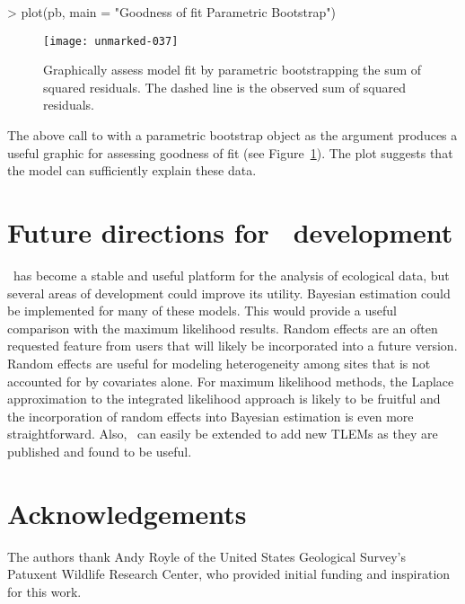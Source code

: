 \documentclass[article,shortnames]{jss}
\newcommand{\um}{\pkg{unmarked}}
\begin{document}
\begin{Schunk}
\begin{Sinput}
> plot(pb, main = "Goodness of fit Parametric Bootstrap")
\end{Sinput}
\end{Schunk}

\begin{figure}[ht]
  \centering
\texttt{[image: unmarked-037]}
\caption{Graphically assess model fit by parametric bootstrapping
  the sum of squared residuals.  The dashed line is the observed sum
  of squared residuals.}
\label{fig:pb}
\end{figure}


The above call to  with a parametric bootstrap object as
the argument produces a useful graphic for assessing goodness of fit
(see Figure~\ref{fig:pb}).  The plot suggests that the model can sufficiently
explain these data.


\section[Future directions for unmarked development]{Future directions for \um\ development}
\label{sec:future-direct-unmark}

\um\ has become a stable and useful platform for the analysis of
ecological data, but several areas of development could improve its
utility.  Bayesian estimation could be implemented for many of these
models.  This would provide a useful comparison with the maximum
likelihood results.  Random effects are an often requested feature
from users that will likely be incorporated into a future version.
Random effects are useful for modeling heterogeneity among sites that
is not accounted for by covariates alone.  For maximum likelihood
methods, the Laplace approximation to the integrated likelihood
approach is likely to be fruitful and the incorporation of random
effects into Bayesian estimation is even more straightforward.  Also,
\um\ can easily be extended to add new TLEMs as they are published
and found to be useful.

\section*{Acknowledgements}

The authors thank Andy Royle of the United States Geological Survey's
Patuxent Wildlife Research Center, who provided initial funding and
inspiration for this work.

%

\end{document}
